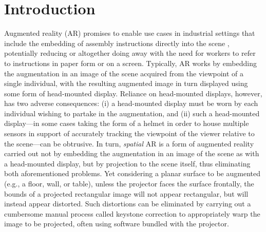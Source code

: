 \documentclass[review]{elsarticle}
\begin{document}
\linenumbers

\section{Introduction}\label{sec:intro}

Augmented reality (AR) \cite{van2010survey,zhou2008trends} promises to enable use cases in industrial settings that include the embedding of assembly instructions directly into the scene \cite{schlund2018moglichkeiten,masood2019augmented,gattullo2019towards,rupprecht2020information,Rupprecht2021}, potentially reducing or altogether doing away with the need for workers to refer to instructions in paper form or on a screen. Typically, AR works by embedding the augmentation in an image of the scene acquired from the viewpoint of a single individual, with the resulting augmented image in turn displayed using some form of head-mounted display. Reliance on head-mounted displays, however, has two adverse consequences: (i) a head-mounted display must be worn by each individual wishing to partake in the augmentation, and (ii) such a head-mounted display---in some cases taking the form of a helmet in order to house multiple sensors in support of accurately tracking the viewpoint of the viewer relative to the scene---can be obtrusive. In turn, \textit{spatial} AR\cite{bimber2019spatial} is a form of augmented reality carried out not by embedding the augmentation in an image of the scene as with a head-mounted display, but by projection to the scene itself, thus eliminating both aforementioned problems. Yet considering a planar surface to be augmented (e.g., a floor, wall, or table), unless the projector faces the surface frontally, the bounds of a projected rectangular image will not appear rectangular, but will instead appear distorted. Such distortions can be eliminated by carrying out a cumbersome manual process called keystone correction to appropriately warp the image to be projected, often using software bundled with the projector.
\end{document}
